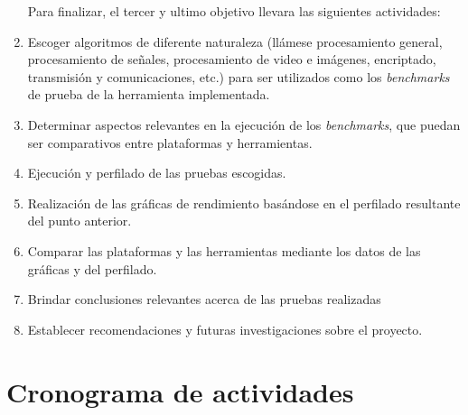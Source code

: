 \begin{enumerate}
 Para finalizar, el tercer y ultimo objetivo llevara las siguientes actividades: \\
 
 \item Escoger algoritmos de diferente naturaleza (llámese procesamiento general, procesamiento de señales, 
 procesamiento de video e imágenes, encriptado, transmisión y comunicaciones, etc.) para ser utilizados como los
 \textit{benchmarks} de prueba de la herramienta implementada.
 \item Determinar aspectos relevantes en la ejecución de los \textit{benchmarks}, que puedan ser comparativos entre
 plataformas y herramientas.
 \item Ejecución y perfilado de las pruebas escogidas.
 \item Realización de las gráficas de rendimiento basándose en el perfilado resultante del punto anterior.
 \item Comparar las plataformas y las herramientas mediante los datos de las gráficas y del perfilado.
 \item Brindar conclusiones relevantes acerca de las pruebas realizadas
 \item Establecer recomendaciones y futuras investigaciones sobre el proyecto.
 
\end{enumerate}

\section{Cronograma de actividades}

